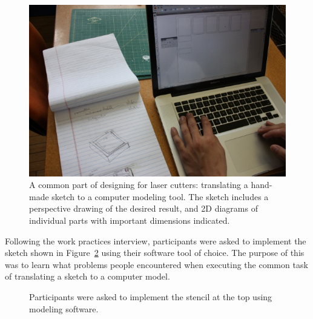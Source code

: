 \documentclass{article}
\begin{document}
\begin{figure}[h]
  \centering
  \includegraphics[width=0.9\linewidth]{img/translate-sketch-to-computer.jpg}
  \caption{A common part of designing for laser cutters: translating a
    hand-made sketch to a computer modeling tool. The sketch includes
    a perspective drawing of the desired result, and 2D diagrams of
    individual parts with important dimensions indicated.}
  \label{fig:translate}
\end{figure}

Following the work practices interview, participants were asked to
implement the sketch shown in Figure~\ref{fig:interview-sketch} using
their software tool of choice. The purpose of this was to learn what
problems people encountered when executing the common task of
translating a sketch to a computer model. 

\begin{figure}[h]
\centering 
{}

\caption{Participants were asked to implement the stencil at the top
  using modeling software.}
\label{fig:interview-sketch}
\end{figure}
\end{document}
